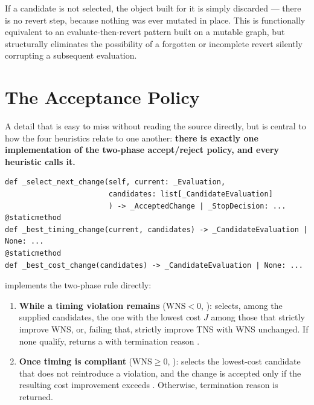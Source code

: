 If a candidate is not selected, the  object built for it is
simply discarded --- there is no revert step, because nothing was ever
mutated in place. This is functionally equivalent to an
evaluate-then-revert pattern built on a mutable graph, but structurally
eliminates the possibility of a forgotten or incomplete revert silently
corrupting a subsequent evaluation.

\section{The Acceptance Policy}
\label{sec:opt-accept}

A detail that is easy to miss without reading the source directly, but is
central to how the four heuristics relate to one another: \textbf{there is
exactly one implementation of the two-phase accept/reject policy, and every
heuristic calls it.}

\vspace{10pt}
\begin{lstlisting}[style=pythonstyle, numbers=none]
def _select_next_change(self, current: _Evaluation,
                        candidates: list[_CandidateEvaluation]
                        ) -> _AcceptedChange | _StopDecision: ...
@staticmethod
def _best_timing_change(current, candidates) -> _CandidateEvaluation | None: ...
@staticmethod
def _best_cost_change(candidates) -> _CandidateEvaluation | None: ...
\end{lstlisting}


\newpage \noindent {} implements the two-phase rule directly:

\begin{enumerate}
    \item \textbf{While a timing violation remains}
          ($\mathrm{WNS} < 0$, ):
           selects, among the supplied
          candidates, the one with the lowest cost $J$ among those that
          strictly improve WNS, or, failing that, strictly improve TNS with
          WNS unchanged. If none qualify, 
          returns a  with termination reason
          .
    \item \textbf{Once timing is compliant}
          ($\mathrm{WNS} \geq 0$, ):
           selects the lowest-cost candidate that
          does not reintroduce a violation, and the change is accepted only
          if the resulting cost improvement exceeds
          . Otherwise, termination reason
           is returned.
\end{enumerate}

